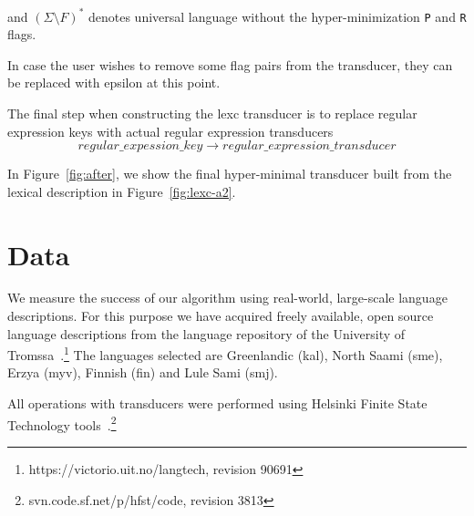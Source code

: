 \documentclass[11pt]{article}
\begin{document}
and $(\Sigma \setminus F)^*$ denotes universal language without the hyper-minimization \verb+P+ and \verb+R+ flags.


In case the user wishes to remove some flag pairs from the transducer, they can be replaced with epsilon at this point.


The final step when constructing the lexc transducer is to replace regular expression keys with actual regular expression transducers
\begin{equation}\label{eq:regex}
regular\_expession\_key \rightarrow regular\_expression\_transducer
\end{equation}

In Figure~\ref{fig:after}, we show the final hyper-minimal transducer built from the lexical description in Figure~\ref{fig:lexc-a2}. 



\section{Data}
\label{sec:data}

We measure the success of our algorithm using real-world, large-scale
language descriptions. For this purpose we have acquired freely
available, open source language descriptions from the language repository of the University of 
Tromssa~\cite{moshagen2013building}.\footnote{https://victorio.uit.no/langtech, revision 90691} The
languages selected are Greenlandic (kal), North Saami (sme), Erzya
(myv), Finnish (fin) and Lule Sami (smj).

All operations with transducers were performed using Helsinki Finite
State Technology tools~\cite{linden2011}.\footnote{svn.code.sf.net/p/hfst/code, revision 3813}
\end{document}
